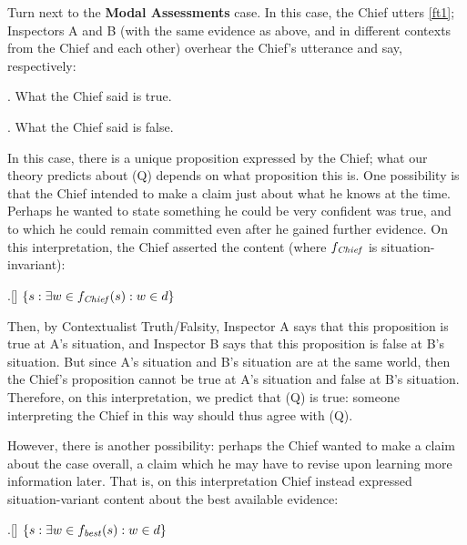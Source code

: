 \documentclass[11pt]{article}
\begin{document}
\begin{doublespace}
Turn next to the {\bf Modal Assessments} case. In this case, the Chief utters \ref{ft1}; Inspectors A and B (with the same evidence as above, and in different contexts from the Chief and each other) overhear the Chief's utterance and say, respectively: 

\ex. What the Chief said is true. 

\ex. What the Chief said is false. 

In this case, there is a unique proposition expressed by the Chief; what our theory predicts about (Q) depends on what proposition this is. One possibility is that the Chief intended to make a claim just about what he knows at the time. Perhaps he wanted to state something he could be very confident was true, and to which he could remain committed even after he gained further evidence. On this interpretation, the Chief asserted the content (where $f_{\it Chief}$ is situation-invariant):

\ex.[] $\{s: \exists w\in f_{\it Chief}(s): w\in d\}$

Then, by {\sc Contextualist Truth/Falsity}, Inspector A says that this proposition is true at A's situation, and Inspector B says that this proposition is false at B's situation. But since A's situation and B's situation are at the same world, then the Chief's proposition cannot be true at A's situation and false at B's situation. Therefore, on this interpretation, we predict that (Q) is true: someone interpreting the Chief in this way should thus agree with (Q). 

However, there is another possibility: perhaps the Chief wanted to make a claim about the case overall, a claim which he may have to revise upon learning more information later. That is, on this interpretation Chief instead expressed situation-variant content about the best available evidence:

\ex.[]  $\{s: \exists w\in f_{\it best}(s): w\in d\}$


\end{doublespace}
\end{document}
